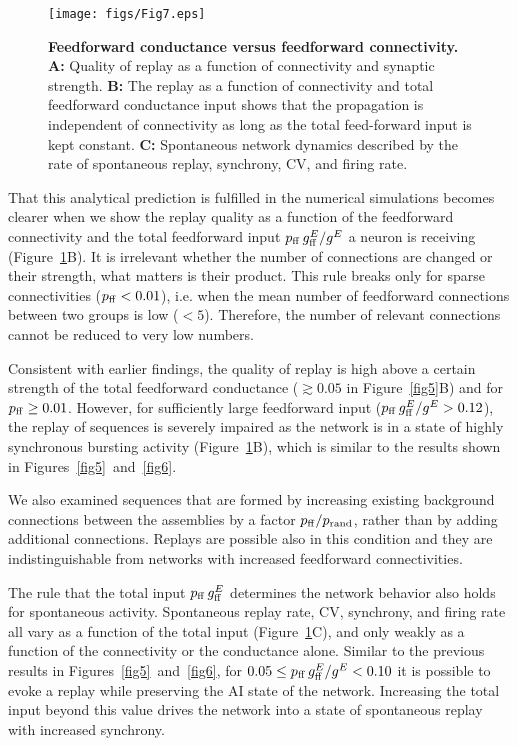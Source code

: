     \begin{figure}[!h]
      \texttt{[image: figs/Fig7.eps]}
      \caption{{\bf Feedforward conductance versus feedforward connectivity.}
        \textbf{A:} Quality of replay as a function of connectivity and synaptic
        strength.
        \textbf{B:} The replay as a function of connectivity and total
        feedforward conductance input shows that the propagation is independent
        of connectivity as long as the total feed-forward input is kept constant.
        \textbf{C:} Spontaneous network dynamics described by the rate of
        spontaneous replay, synchrony, CV, and firing rate.}
      \label{fig7}
    \end{figure}
    
    That this analytical prediction is fulfilled in the numerical simulations
    becomes clearer when we show the replay quality as a function of the
    feedforward connectivity and the total feedforward input $p_{\rm ff}\,
    g^{E}_{\rm ff} / {g^E}$ a neuron is receiving (Figure~\ref{fig7}B). It is
    irrelevant whether the number of connections are changed or their strength,
    what matters is their product. This rule breaks only for sparse
    connectivities ($p_{\rm ff}<0.01$), i.e. when the mean number of
    feedforward connections between two groups is low ($<5$). Therefore, the
    number of relevant connections cannot be reduced to very low numbers.

    Consistent with earlier findings, the quality of replay is high above a
    certain strength of the total feedforward conductance ($\gtrsim 0.05$ in
    Figure~\ref{fig5}B) and for $p_{\rm ff} \ge 0.01$. However, for sufficiently large
    feedforward input ($p_{\rm ff}\, g^{E}_{\rm ff} / {g^E} >0.12$), the replay
    of sequences is severely impaired as the network is in a state of highly
    synchronous bursting activity (Figure~\ref{fig7}B), which is similar to the
    results shown in Figures~\ref{fig5}~and~\ref{fig6}.

    We also examined sequences that are formed by increasing existing
    background connections between the assemblies by a factor $p_{\rm
    ff}/p_{\rm rand}$, rather than by adding additional connections. Replays
    are possible also in this condition and they are indistinguishable from
    networks with increased feedforward connectivities.

    The rule that the total input $p_{\rm ff}\,g^{E}_{\rm ff}$ determines the
    network behavior also holds for spontaneous activity. Spontaneous replay
    rate, CV, synchrony, and firing rate all vary as a function of the total
    input (Figure~\ref{fig7}C), and only weakly as a function of the connectivity
    or the conductance alone. Similar to the previous results in
    Figures~\ref{fig5}~and~\ref{fig6}, for $0.05 \le  p_{\rm ff}\, g^{E}_{\rm ff}
    /  {g^E} < 0.10 $ it is possible to evoke a replay while preserving the AI
    state of the network. Increasing the total input beyond this value drives
    the network into a state of spontaneous replay with increased synchrony.
  

